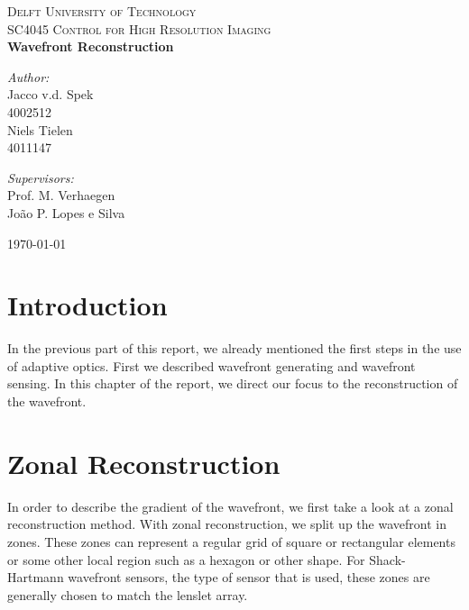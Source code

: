 \documentclass{article}
\begin{document}
\begin{titlepage}
\begin{center}

\textsc{\LARGE Delft University of Technology}\\[1.5cm]
\textsc{ SC4045 Control for High Resolution Imaging}\\[0.5cm]

{\huge\bfseries Wavefront Reconstruction \\[0.4cm] }

\begin{minipage}{0.4\textwidth}
\begin{flushleft} \large
\emph{Author:}\\
Jacco v.d. Spek \\
4002512 \\
Niels Tielen \\
4011147

\end{flushleft}
\end{minipage}
\begin{minipage}{0.4\textwidth}
\begin{flushright} \large
\emph{Supervisors:} \\
Prof. M. Verhaegen \\
João P. Lopes e Silva  
\end{flushright}
\end{minipage}

\vfill
{\large \today}
\end{center}
\end{titlepage}

\section*{Introduction}

In the previous part of this report, we already mentioned the first steps in the use of adaptive optics. First we described wavefront generating and wavefront sensing. In this chapter of the report, we direct our focus to the reconstruction of the wavefront. 

\section{Zonal Reconstruction}
In order to describe the gradient of the wavefront, we first take a look at a zonal reconstruction method. With zonal reconstruction, we split up the wavefront in zones. These zones can represent a regular grid of square or rectangular elements or some other local region such as a hexagon or other shape. For Shack-Hartmann wavefront sensors, the type of sensor that is used, these zones are generally chosen to match the lenslet array.
\end{document}
